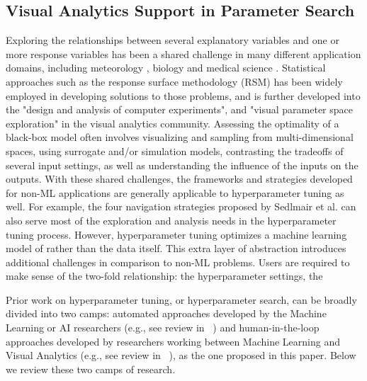 \documentclass[preprint]{vgtc}        %
\begin{document}
\subsection{Visual Analytics Support in Parameter Search}
Exploring the relationships between several explanatory variables and one or more response variables has been a shared challenge in many different application domains, including meteorology \cite{Potter2009Ensemble-Vis:Data}, biology \cite{Pretorius2011VisualizationAnalysis} and medical science \cite{Afzal2011VisualEvaluation}. Statistical approaches such as the response surface methodology (RSM) \cite{BoxG.E.P.andWilson1992OnConditions} has been widely employed in developing solutions to those problems, and is further developed into the "design and analysis of computer experiments", and "visual parameter space exploration" \cite{Sedlmair2014VisualFramework} in the visual analytics community. Assessing the optimality of a black-box model often involves visualizing and sampling from multi-dimensional spaces, using surrogate and/or simulation models, contrasting the tradeoffs of several input settings, as well as understanding the influence of the inputs on the outputs. With these shared challenges, the frameworks and strategies developed for non-ML applications are generally applicable to hyperparameter tuning as well. For example, the four navigation strategies proposed by Sedlmair et al. \cite{Sedlmair2014VisualFramework} can also serve most of the exploration and analysis needs in the hyperparameter tuning process. However, hyperparameter tuning optimizes a machine learning model of  rather than the data itself. This extra layer of abstraction introduces additional challenges in comparison to non-ML problems. Users are required to make sense of the two-fold relationship: the hyperparameter settings, the  

Prior work on hyperparameter tuning, or hyperparameter search, can be broadly divided into two camps: automated approaches developed by the Machine Learning or AI researchers (e.g., see review in ~\cite{Claesen2014EasyOptunity}) and human-in-the-loop approaches developed by researchers working between Machine Learning and Visual Analytics (e.g., see review in ~\cite{SachaHuman-CenteredChallenges}), as the one proposed in this paper. Below we review these two camps of research.
\end{document}
